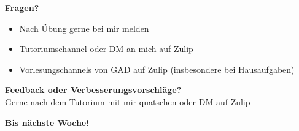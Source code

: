 \documentclass{beamer}
\begin{document}
\begin{frame}
	\textbf{Fragen?}
	\begin{itemize}
		\item Nach Übung gerne bei mir melden
		\item Tutoriumschannel oder DM an mich auf Zulip
		\item Vorlesungschannels von GAD auf Zulip (insbesondere bei Hausaufgaben)
	\end{itemize}

	\medskip
	\textbf{Feedback oder Verbesserungsvorschläge?} \\
	Gerne nach dem Tutorium mit mir quatschen oder DM auf Zulip

	\medskip
	\textbf{Bis nächste Woche!}
\end{frame}

\end{document}
